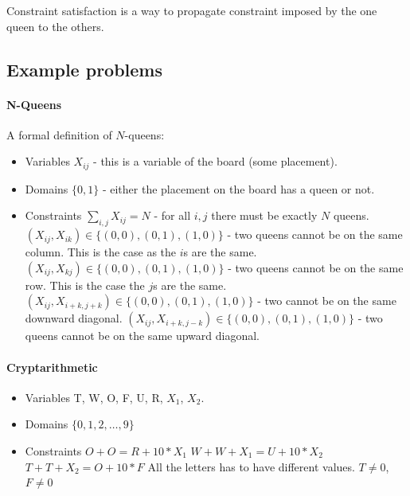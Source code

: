 \documentclass{article}
\begin{document}
Constraint satisfaction is a way to propagate constraint imposed by the one
queen to the others. 

\subsection{Example problems}%
\label{sub:example}

\paragraph{N-Queens}

A formal definition of $N$-queens:

\begin{itemize}
  \item Variables
    \subitem $X_{ij}$ - this is a variable of the board (some placement).
  \item Domains 
    \subitem $\{0,1\}$ - either the placement on the board has a queen or not.
  \item Constraints 
    \subitem $\sum_{i,j}X_{ij} = N$ - for all $i,j$ there must be exactly $N$
    queens.
    \subitem $(X_{ij}, X_{ik}) \in \{(0,0), (0, 1), (1,0)\}$ - two queens cannot
    be on the same column. This is the case as the $i$s are the same.
    \subitem $(X_{ij}, X_{kj}) \in \{(0,0), (0, 1), (1,0)\}$ - two queens cannot
    be on the same row. This is the case the $j$s are the same.
    \subitem $(X_{ij}, X_{i+k, j + k}) \in \{(0,0), (0, 1), (1,0)\}$ - two
    cannot be on the same downward diagonal.
    \subitem $(X_{ij}, X_{i+k, j - k}) \in \{(0,0), (0, 1), (1,0)\}$ - two
    queens cannot be on the same upward diagonal.
\end{itemize}

\paragraph{Cryptarithmetic}

\begin{itemize}
  \item Variables 
    \subitem T, W, O, F, U, R, $X_1$, $X_2$.
  \item Domains
    \subitem $\{0, 1, 2, \dots, 9\}$
  \item Constraints
    \subitem $O + O = R + 10 *X_1$
    \subitem $W+W + X_1 = U + 10 * X_2$
    \subitem $T + T + X_2 = O + 10 * F$
    \subitem All the letters has to have different values.
    \subitem $T \neq 0$, $F \neq 0$
\end{itemize}
\end{document}
